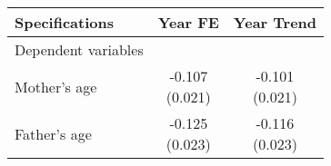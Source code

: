\begin{tabular}{lcc}
\hline \hline
Specifications & Year FE & Year Trend \\
\hline
Dependent variables &  &  \\
Mother's age & \makecell[tc]{-0.107\\(0.021)} & \makecell[tc]{-0.101\\(0.021)} \\
Father's age & \makecell[tc]{-0.125\\(0.023)} & \makecell[tc]{-0.116\\(0.023)} \\
\hline \hline
\end{tabular}